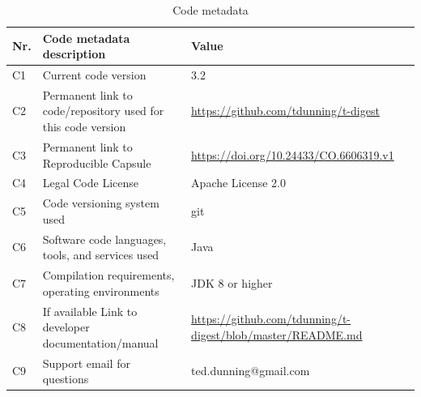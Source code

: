 \documentclass[preprint,12pt, a4paper]{elsarticle}
\begin{document}

 



\begin{table}[!h]
\begin{tabular}{|l|p{5cm}|p{8cm}|}
\hline
\textbf{Nr.} & \textbf{Code metadata description} & \textbf{Value} \\
\hline
C1 & Current code version &3.2 \\
\hline
C2 & Permanent link to code/repository used for this code version & \url{https://github.com/tdunning/t-digest} \\
\hline
C3  & Permanent link to Reproducible Capsule & \url{https://doi.org/10.24433/CO.6606319.v1} \\
\hline
C4 & Legal Code License   & Apache License 2.0 \\
\hline
C5 & Code versioning system used & git \\
\hline
C6 & Software code languages, tools, and services used & Java \\
\hline
C7 & Compilation requirements, operating environments & JDK 8 or higher  \\
\hline
C8 & If available Link to developer documentation/manual & \url{https://github.com/tdunning/t-digest/blob/master/README.md} \\
\hline
C9 & Support email for questions & ted.dunning@gmail.com  \\
\hline
\end{tabular}
\caption{Code metadata}
\label{metadata} 
\end{table}
\end{document}

